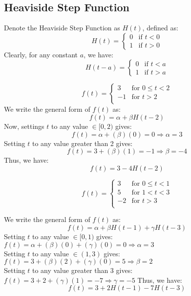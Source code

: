 \documentclass[a4paper, 10pt]{article}
\begin{document}
\subsection{Heaviside Step Function}
Denote the Heaviside Step Function as $H(t)$, defined as:
$$
H(t) = \begin{cases}
0 & \text{if } t < 0 \\
1 & \text{if } t > 0
\end{cases}
$$
Clearly, for any constant $a$, we have:
$$
H(t-a) = \begin{cases}
0 & \text{if } t < a \\
1 & \text{if } t > a
\end{cases}
$$

\begin{examplebox}
  $$f(t) = \begin{cases}
    3 & \text{for } 0 \leq t < 2 \\
    -1 & \text{for } t > 2 \\
  \end{cases}$$
  We write the general form of $f(t)$ as:
  $$f(t) = \alpha + \beta H(t-2)$$
  Now, settings $t$ to any value $\in [0,2)$ gives:
  $$f(t) = \alpha + (\beta)(0) = 0 \Rightarrow \alpha = 3$$
  Setting $t$ to any value greater than 2 gives:
  $$f(t) = 3 + (\beta)(1) = -1 \Rightarrow \beta = -4 $$
  Thus, we have:
  $$f(t) = 3 - 4H(t-2)$$
\end{examplebox}

\begin{examplebox}
  $$f(t) = \begin{cases}
    3 & \text{for } 0 \leq t < 1 \\
    5 & \text{for } 1 < t < 3 \\
    -2 & \text{for } t > 3 \\
  \end{cases}$$

  We write the general form of $f(t)$ as:
  $$f(t) = \alpha + \beta H(t-1) + \gamma H(t-3)$$
  Setting $t$ to any value $\in [0,1)$ gives: $f(t) = \alpha + (\beta)(0) + (\gamma)(0) = 0 \Rightarrow \alpha = 3$ \\
  Setting $t$ to any value $\in (1,3)$ gives: $f(t) = 3 + (\beta)(2) + (\gamma)(0) = 5 \Rightarrow \beta = 2$ \\
  Setting $t$ to any value greater than 3 gives: $f(t) = 3 + 2 + (\gamma)(1) = -7 \Rightarrow \gamma = -5$
  Thus, we have:
  $$f(t) = 3 + 2H(t-1) - 7H(t-3)$$
\end{examplebox}
\end{document}

